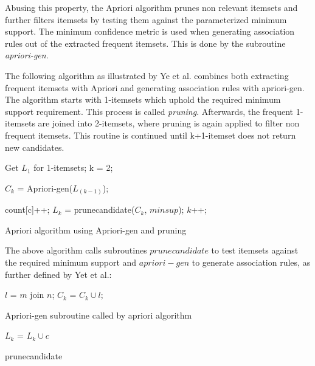 \documentclass[bachelor,english]{info1thesis}
\begin{document}
Abusing this property, the Apriori algorithm prunes non relevant itemsets and further filters itemsets by testing them against the parameterized minimum support. The minimum confidence metric is used when generating association rules out of the extracted frequent itemsets. This is done by the subroutine \textit{apriori-gen}.

The following algorithm as illustrated by Ye et al. \cite{ye2006parallel} combines both extracting frequent itemsets with Apriori and generating association rules with apriori-gen. The algorithm starts with 1-itemsets which uphold the required minimum support requirement. This process is called \textit{pruning}. Afterwards, the frequent 1-itemsets are joined into 2-itemsets, where pruning is again applied to filter non frequent itemsets. This routine is continued until k+1-itemset does not return new candidates. 

   \begin{algorithm}
	\SetAlgoLined
	Get $L_1$ for 1-itemsets;\newline
	k = 2;\newline
	{
		$C_k$ = Apriori-gen($L_(k-1)$);
		
	}
	{
		{
			{
				count[c]++;
			}
		}
	}
	$L_k$ = prunecandidate($C_k$, $minsup$);
	$k$++;
	\caption{Apriori algorithm using Apriori-gen and pruning}
	\label{alg:apriori}
\end{algorithm}

The above algorithm calls subroutines $prunecandidate$ to test itemsets against the required minimum support and $apriori-gen$ to generate association rules, as further defined by Yet et al.:

   \begin{algorithm}
	\SetAlgoLined
	{
		{
			{
				$l$ = $m$ join $n$;
				{
					$C_k$ = $C_k \cup l$;
				}
			}
		}
	}
	\caption{Apriori-gen subroutine called by apriori algorithm}
	\label{alg:apriorigen}
\end{algorithm}


   \begin{algorithm}
	\SetAlgoLined
	{
	{
		$L_k$ = $L_k \cup c$
	}
	}
	\caption{prunecandidate}
	\label{alg:aprioriprune}
\end{algorithm}
\end{document}
